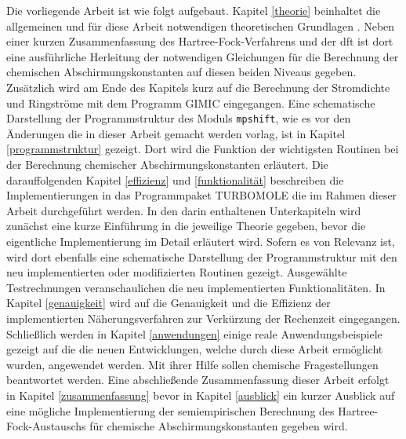 \bigskip
Die vorliegende Arbeit ist wie folgt aufgebaut. Kapitel \ref{theorie} beinhaltet die allgemeinen und für diese Arbeit notwendigen theoretischen Grundlagen . Neben einer kurzen Zusammenfassung des Hartree-Fock-Verfahrens und der \ac{dft} ist dort eine ausführliche Herleitung der notwendigen Gleichungen für die Berechnung der chemischen Abschirmungskonstanten auf diesen beiden Niveaus gegeben. Zusätzlich wird am Ende des Kapitels kurz auf die Berechnung der Stromdichte und Ringströme mit dem Programm GIMIC\supercite{juselius2004calculation,taubert2011calculation,fliegl2011gauge,sundholm2016calculations} eingegangen. Eine schematische Darstellung der Programmstruktur des Moduls \texttt{mpshift}, wie es vor den Änderungen die in dieser Arbeit gemacht werden vorlag, ist in Kapitel \ref{programmstruktur} gezeigt. Dort wird die Funktion der wichtigsten Routinen bei der Berechnung chemischer Abschirmungskonstanten erläutert. Die darauffolgenden Kapitel \ref{effizienz} und \ref{funktionalität} beschreiben die Implementierungen in das Programmpaket \textsc{TURBOMOLE} die im Rahmen dieser Arbeit durchgeführt werden. In den darin enthaltenen Unterkapiteln wird zunächst eine kurze Einführung in die jeweilige Theorie gegeben, bevor die eigentliche Implementierung im Detail erläutert wird. Sofern es von Relevanz ist, wird dort ebenfalls eine schematische Darstellung der Programmstruktur mit den neu implementierten oder modifizierten Routinen gezeigt. Ausgewählte Testrechnungen veranschaulichen die neu implementierten Funktionalitäten. In Kapitel \ref{genauigkeit} wird auf die Genauigkeit und die Effizienz der implementierten Näherungsverfahren zur Verkürzung der Rechenzeit eingegangen. Schließlich werden in Kapitel \ref{anwendungen} einige reale Anwendungsbeispiele gezeigt auf die die  neuen Entwicklungen, welche durch diese Arbeit ermöglicht wurden, angewendet werden. Mit ihrer Hilfe sollen chemische Fragestellungen beantwortet werden. Eine abschließende Zusammenfassung dieser Arbeit erfolgt in Kapitel \ref{zusammenfassung} bevor in Kapitel \ref{ausblick} ein kurzer Ausblick auf eine mögliche Implementierung der semiempirischen Berechnung des Hartree-Fock-Austauschs für chemische Abschirmungskonstanten gegeben wird.